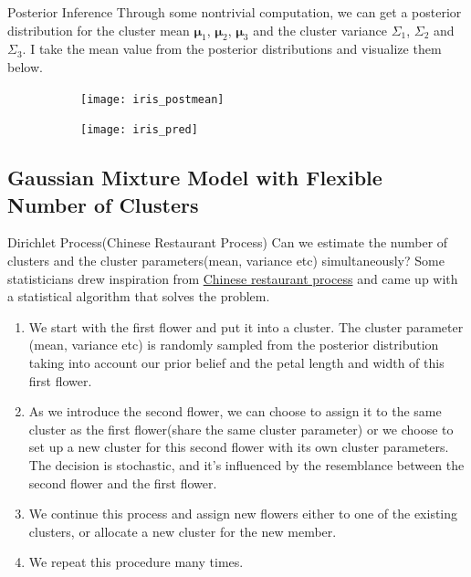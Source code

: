 \documentclass{beamer}
\begin{document}
	\begin{frame}{Posterior Inference}
		Through some nontrivial computation, we can get a posterior distribution for the cluster mean $\bm{\mu}_1$, $\bm{\mu}_2$, $\bm{\mu}_3$ and the cluster variance $\Sigma_1$, $\Sigma_2$ and $\Sigma_3$. I take the mean value from the posterior distributions and visualize them below.
		\begin{figure}[htbp]
		\begin{subfigure}[b]{0.48\columnwidth}
			\centering
			\texttt{[image: iris\_postmean]}
		\end{subfigure}
		\hfill
		\begin{subfigure}[b]{0.48\columnwidth}
			\centering
			\texttt{[image: iris\_pred]}
		\end{subfigure}
			\end{figure}
		
	\end{frame}


	\subsection{Gaussian Mixture Model with Flexible Number of Clusters}
		\begin{frame}
		\tableofcontents
		[
		currentsection,
		currentsubsection,
		subsectionstyle=show/shaded/hide
		]
	\end{frame}

	\begin{frame}{Dirichlet Process(Chinese Restaurant Process)}
		Can we estimate the number of clusters and the cluster parameters(mean, variance etc) simultaneously? Some statisticians drew inspiration from 
		\href{https://topicmodels.west.uni-koblenz.de/ckling/tmt/crp.html?parameters=10&dp=1}{Chinese restaurant process} and came up with a statistical algorithm that solves the problem.
		\pause
		
		\begin{enumerate}
			\item We start with the first flower and put it into a cluster. The cluster parameter (mean, variance etc) is randomly sampled from the posterior distribution taking into account our prior belief and the petal length and width of this first flower.
			\pause
			\item As we introduce the second flower, we can choose to assign it to the same cluster as the first flower(share the same cluster parameter) or we choose to set up a new cluster for this second flower with its own cluster parameters. The decision is stochastic, and it's influenced by the resemblance between the second flower and the first flower.
			\pause
			\item We continue this process and assign new flowers either to one of the existing clusters, or allocate a new cluster for the new member.
			\pause
			\item We repeat this procedure many times. 
		\end{enumerate}
	\end{frame}
\end{document}
